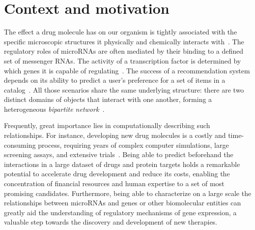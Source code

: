 

\section{Context and motivation}



The effect a drug molecule has on our organism is tightly associated with the specific microscopic structures it physically and chemically interacts with~\cite{bagherian2020machine,chen2018machine}. The regulatory roles of microRNAs are often mediated by their binding to a defined set of messenger RNAs. The activity of a transcription factor is determined by which genes it is capable of regulating~\cite{faith2007largescale}. The success of a recommendation system depends on its ability to predict a user's preference for a set of items in a catalog~\cite{lu2012recommender}.
%
All those scenarios share the same underlying structure: there are two distinct domains of objects that interact with one another, forming a heterogeneous \emph{bipartite network}~\cite{asratian1998bipartite}.
%


Frequently, great importance lies in computationally describing such relationships. For instance, developing new drug molecules is a costly and time-consuming process,
requiring years of complex computer simulations, large screening assays, and extensive trials~\cite{}.
Being able to predict beforehand the interactions in a large dataset of drugs and protein targets holds a remarkable potential to accelerate drug development and reduce its costs, enabling the concentration of financial resources and human expertise to a set of most promising candidates. Furthermore, being able to characterize on a large scale the relationships between microRNAs and genes or other biomolecular entities can greatly aid the understanding of regulatory mechanisms of gene expression, a valuable step towards the discovery and development of new therapies. 

